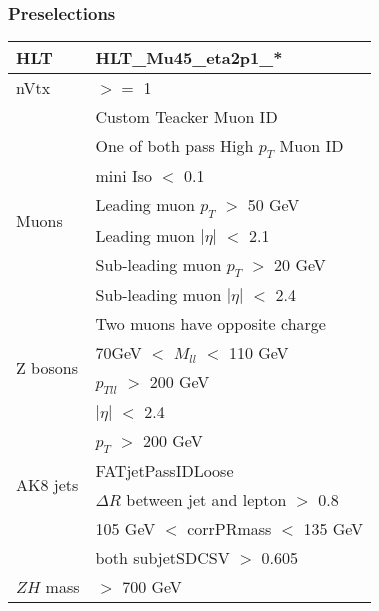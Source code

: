 \documentclass[aspectratio=169]{beamer}
\begin{document}
\begin{frame}
  \frametitle{Preselections}
  \justifying
  \begin{tiny}
    \begin{center}
      \begin{tabular}[t]{ | l | l | }
        \hline
        HLT
        & HLT\_Mu45\_eta2p1\_*                           \\
        \hline
        nVtx                   
        & $>=$ 1                                         \\
        \hline
        \multirow{8}{*}{Muons}
        & Custom Teacker Muon ID                         \\
        & One of both pass High $p_T$ Muon ID            \\
        & mini Iso $<$ 0.1                               \\
        & Leading muon $p_T$ $>$ 50 GeV                  \\
        & Leading muon $|\eta|$ $<$ 2.1                  \\
        & Sub-leading muon $p_T$ $>$ 20 GeV              \\
        & Sub-leading muon $|\eta|$ $<$ 2.4              \\
        & Two muons have opposite charge                 \\
        \hline
        \multirow{2}{*}{Z bosons}
        & 70GeV $<$ $M_{ll}$ $<$ 110 GeV                 \\
        & $p_{Tll}$ $>$ 200 GeV                          \\
        \hline
        \multirow{6}{*}{AK8 jets}
        & $|\eta|$ $<$ 2.4                               \\
        & $p_T$ $>$ 200 GeV                              \\
        & FATjetPassIDLoose                              \\
        & $\Delta R$ between jet and lepton $>$ 0.8      \\
        & 105 GeV $<$ corrPRmass $<$ 135 GeV             \\
        & both subjetSDCSV $>$ 0.605                     \\
        \hline
        $ZH$ mass             
        & $>$ 700 GeV                                    \\
        \hline
      \end{tabular}
    \end{center}
  \end{tiny}
\end{frame}
\end{document}

